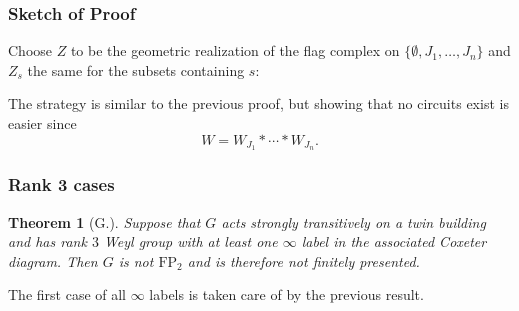 \documentclass[xcolor=dvipsnames]{beamer}
\newcommand{\FP}{\mathrm{FP}}
\newtheorem{Theo}{Theorem}
\theoremstyle{definition}
\begin{document}
\begin{frame}
\frametitle{Sketch of Proof}
Choose $Z$ to be the geometric realization of the flag complex on $\{\emptyset, J_1,\ldots, J_n\}$ and $Z_s$ the same for the subsets containing $s$:
\begin{center}
\end{center}
The strategy is similar to the previous proof, but showing that no circuits exist is easier since 
$$
W = W_{J_1}*\cdots *W_{J_n}.
$$
\end{frame}

\begin{frame}
\frametitle{Rank 3 cases}
\begin{Theo}[G.]
Suppose that $G$ acts strongly transitively on a twin building and has rank $3$ Weyl group with at least one $\infty$ label in the associated Coxeter diagram. Then $G$ is not $\FP_2$ and is therefore not finitely presented.
\end{Theo}
\vskip 1cm
The first case of all $\infty$ labels is taken care of by the previous result.
\end{frame}
\end{document}
